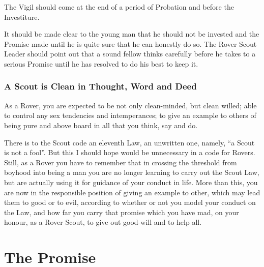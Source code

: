 \documentclass[11pt]{article}
\begin{document}
The Vigil should come at the end of a period of Probation and before the Investiture.

It should be made clear to the young man that he should not be invested and the Promise made until he is quite sure that he can honestly do so. The Rover Scout Leader should point out that a sound fellow thinks carefully before he takes to a serious Promise until he has resolved to do his best to keep it.


\subsubsection{A Scout is Clean in Thought, Word and Deed}
As a Rover, you are expected to be not only clean-minded, but clean willed; able to control any sex tendencies and intemperances; to give an example to others of being pure and above board in all that you think, say and do.

There is to the Scout code an eleventh Law, an unwritten one, namely, ``a Scout is not a fool''. But this I should hope would be unnecessary in a code for Rovers. Still, as a Rover you have to remember that in crossing the threshold from boyhood into being a man you are no longer learning to carry out the Scout Law, but are actually using it for guidance of your conduct in life. More than this, you are now in the responsible position of giving an example to other, which may lead them to good or to evil, according to whether or not you model your conduct on the Law, and how far you carry that promise which you have mad, on your honour, as a Rover Scout, to give out good-will and to help all.


\section{The Promise}
\end{document}
